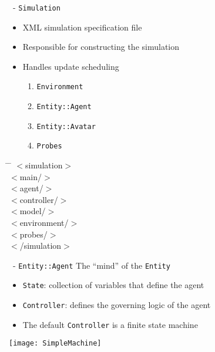 \begin{slide}{\SWEEP~- \texttt{Simulation}}
  \begin{minipage}{.65\textwidth}
    \begin{itemize}
    \item XML simulation specification file
    \item Responsible for constructing the simulation
    \item Handles update scheduling
      \begin{enumerate}
      \item \texttt{Environment}
      \item \texttt{Entity::Agent}
      \item \texttt{Entity::Avatar}
      \item \texttt{Probes}
      \end{enumerate}
    \end{itemize}
  \end{minipage}
  \hfill
  \begin{minipage}{.25\textwidth}
    \ttfamily
    \scriptsize
    \begin{tabbing}
      \hspace{1ex} \= \hspace{1ex} \= \kill
      $<$simulation$>$ \\
      \> $<$main/$>$ \\
      \> $<$agent/$>$ \\
      \> $<$controller/$>$ \\
      \> $<$model/$>$ \\
      \> $<$environment/$>$ \\
      \> $<$probes/$>$ \\
      $<$/simulation$>$ \\
    \end{tabbing}
  \end{minipage}
\end{slide}


\begin{slide}{\SWEEP~- \texttt{Entity::Agent}}
  The ``mind'' of the \texttt{Entity}
  \begin{itemize}
  \item \texttt{State}: collection of variables that define the agent
  \item \texttt{Controller}: defines the governing logic of the agent
  \item The default \texttt{Controller} is a finite state machine
  \end{itemize}
  
  \centering
  \begin{minipage}{.45\linewidth}
    \texttt{[image: SimpleMachine]}
  \end{minipage}
\end{slide}


